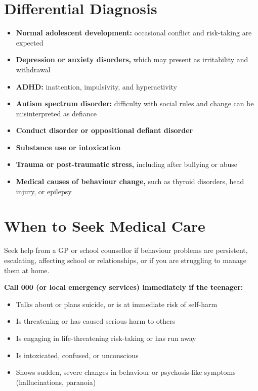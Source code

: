 \section*{Differential Diagnosis}
\begin{itemize}
    \item \textbf{Normal adolescent development:} occasional conflict and risk-taking are expected
    \item \textbf{Depression or anxiety disorders,} which may present as irritability and withdrawal
    \item \textbf{ADHD:} inattention, impulsivity, and hyperactivity
    \item \textbf{Autism spectrum disorder:} difficulty with social rules and change can be misinterpreted as defiance
    \item \textbf{Conduct disorder or oppositional defiant disorder}
    \item \textbf{Substance use or intoxication}
    \item \textbf{Trauma or post-traumatic stress,} including after bullying or abuse
    \item \textbf{Medical causes of behaviour change,} such as thyroid disorders, head injury, or epilepsy
\end{itemize}

\section*{When to Seek Medical Care}
Seek help from a GP or school counsellor if behaviour problems are persistent, escalating, affecting school or relationships, or if you are struggling to manage them at home.

\textbf{Call 000 (or local emergency services) immediately if the teenager:}
\begin{itemize}
    \item Talks about or plans suicide, or is at immediate risk of self-harm
    \item Is threatening or has caused serious harm to others
    \item Is engaging in life-threatening risk-taking or has run away
    \item Is intoxicated, confused, or unconscious
    \item Shows sudden, severe changes in behaviour or psychosis-like symptoms (hallucinations, paranoia)
\end{itemize}

